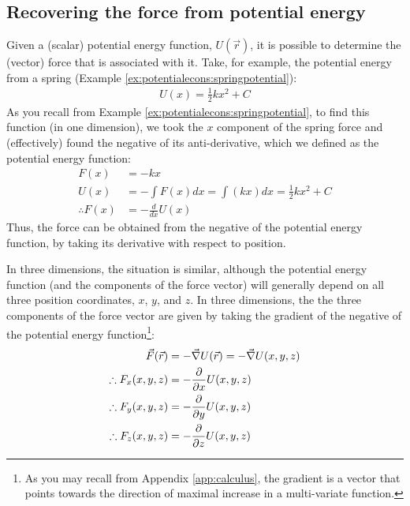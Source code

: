 \subsection{Recovering the force from potential energy}
Given a (scalar) potential energy function, $U(\vec r)$, it is possible to determine the (vector) force that is associated with it. Take, for example, the potential energy from a spring (Example \ref{ex:potentialecons:springpotential}):
\begin{align*}
U(x) = \frac{1}{2}kx^2 + C
\end{align*} 
As you recall from Example \ref{ex:potentialecons:springpotential}, to find this function (in one dimension), we took the $x$ component of the spring force and (effectively) found the negative of its anti-derivative, which we defined as the potential energy function:
\begin{align*}
F(x) &= -kx\\
U(x) &= -\int F(x) dx = \int (kx) dx = \frac{1}{2}kx^2+C\\
\therefore F(x) &= -\frac{d}{dx}U(x)
\end{align*}
Thus, the force can be obtained from the negative of the potential energy function, by taking its derivative with respect to position.

In three dimensions, the situation is similar, although the potential energy function (and the components of the force vector) will generally depend on all three position coordinates, $x$, $y$, and $z$. In three dimensions, the the three components of the force vector are given by taking the gradient of the negative of the potential energy function\footnote{As you may recall from Appendix \ref{app:calculus}, the gradient is a vector that points towards the direction of maximal increase in a multi-variate function.}:
\begin{align}
\vec F(\vec r) &= -\vec\nabla U(\vec r)=-\vec\nabla U(x,y,z)\nonumber\\
\therefore F_x(x,y,z) &= -\frac{\partial }{\partial x}U(x,y,z)\nonumber\\
\therefore F_y(x,y,z) &= -\frac{\partial }{\partial y}U(x,y,z)\nonumber\\
\therefore F_z(x,y,z) &= -\frac{\partial }{\partial z}U(x,y,z)
\end{align}

